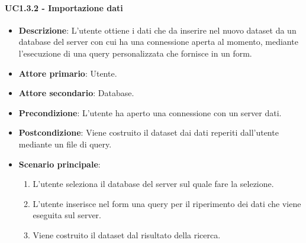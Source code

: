 \paragraph{UC1.3.2 - Importazione dati}
\label{par:uc1.3.2}
\begin{itemize}
    \item \textbf{Descrizione}: L'utente ottiene i dati che da inserire nel nuovo dataset da un database
                                del server con cui ha una connessione aperta al momento, mediante 
                                l'esecuzione di una query personalizzata che fornisce in un form.

    \item \textbf{Attore primario}: Utente.
    
    \item \textbf{Attore secondario}: Database.
    
    \item \textbf{Precondizione}:   L'utente ha aperto una connessione con un server dati.
    \item \textbf{Postcondizione}:  Viene costruito il dataset dai dati reperiti dall'utente mediante un file di query.

	\item \textbf{Scenario principale}:
        \begin{enumerate}
            \item L'utente seleziona il database del server sul quale fare la selezione.
			\item L'utente inserisce nel form una query per il riperimento dei dati che viene eseguita sul server.
			\item Viene costruito il dataset dal risultato della ricerca.
        \end{enumerate}
\end{itemize}

